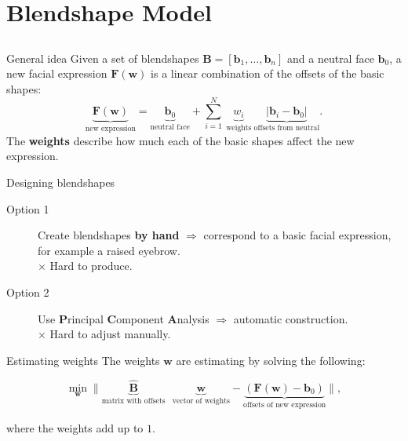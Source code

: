 \documentclass{beamer}
\newcommand{\w}{\mathbf{w}}
\newcommand{\F}{\mathbf{F}}
\newcommand{\bb}{\mathbf{b}}
\begin{document}
\section{Blendshape Model}
\subsection{ }
\begin{frame}{General idea}
Given a set of blendshapes $\mathbf{B} = [\bb_1, \ldots, \bb_n]$ and a neutral face $\bb_0$, a new facial expression $\mathbf{F(\w)}$ is a linear combination of the offsets of the basic shapes:
\begin{equation*}
	\underbrace{\F(\w)}_{\text{new expression}} = \underbrace{ \bb_0 }_{\text{neutral face}}+ \sum_{i=1}^N \: \underbrace{w_i}_{\text{weights}} \: \underbrace{|\bb_i - \bb_0|}_{\text{offsets from neutral}}.
\end{equation*}
The \textbf{weights} describe how much each of the basic shapes affect the new expression. 
\end{frame}


\begin{frame}{Designing blendshapes}
\begin{description}
	\item[Option 1] Create blendshapes \textbf{by hand} $\Rightarrow$ correspond to a basic facial expression, for example a raised eyebrow.\\
					$\times$  Hard to produce. \vspace{0.5 cm}
	\item[Option 2] Use \textbf{P}rincipal \textbf{C}omponent \textbf{A}nalysis $\Rightarrow$ automatic construction. \\
					$\times$  Hard to adjust manually.
\end{description}

\end{frame}


\begin{frame}{Estimating weights}
The weights $\w$ are estimating by solving the following:


\begin{minipage}[t]{0.95\linewidth} 
\begin{tcolorbox}[colback=gray!5,colframe=jvagreen, title=Minimisation problem]
\begin{equation*}
	\min_\w \| \underbrace{\hat{\mathbf{B}}}_{\text{matrix with offsets}} \: \: \: \underbrace{\w}_{\text{vector of weights}} - \underbrace{(\F(\w) - \bb_0)}_{\text{offsets of new expression}} \|,
\end{equation*}        
\end{tcolorbox} 
\end{minipage}  \vspace{0.5 cm}

where the weights add up to $1$.

\end{frame}
\end{document}
